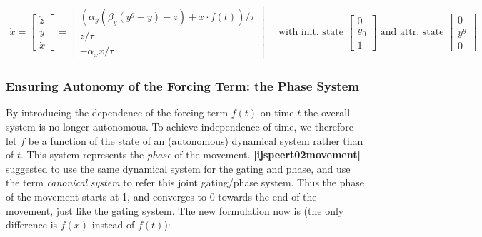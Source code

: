 \begin{eqnarray*} \dot{x} = \left[ \begin{array}{l} {\dot{z}} \\ {\dot{y}} \\ {\dot{x}} \end{array} \right] = \left[ \begin{array}{l} (\alpha_y (\beta_y({y}^{g}-{y})-{z}) + x\cdot f(t))/\tau \\ {z}/\tau \\ -\alpha_x x/\tau \end{array} \right] \mbox{~~~~with init. state~} \left[ \begin{array}{l} 0 \\ y_0 \\ 1 \end{array} \right] \mbox{~and attr. state~} \left[ \begin{array}{l} {0} \\ {y}^g \\ 0 \end{array} \right] \end{eqnarray*}\hypertarget{page_dmp_sec_forcing_autonomy}{}\subsubsection{Ensuring Autonomy of the Forcing Term\+: the Phase System}\label{page_dmp_sec_forcing_autonomy}
By introducing the dependence of the forcing term $ f(t)$ on time $ t $ the overall system is no longer autonomous. To achieve independence of time, we therefore let $ f $ be a function of the state of an (autonomous) dynamical system rather than of $ t $. This system represents the {\itshape phase} of the movement. {\bfseries [ijspeert02movement]} suggested to use the same dynamical system for the gating and phase, and use the term {\itshape canonical} {\itshape system} to refer this joint gating/phase system. Thus the phase of the movement starts at 1, and converges to 0 towards the end of the movement, just like the gating system. The new formulation now is (the only difference is $ f(x)$ instead of $ f(t)$)\+:

